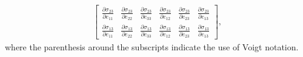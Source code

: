 \begin{eqnarray}
\begin{bmatrix}
%
\frac{\partial \sigma_{23}}{\partial e_{11}} & \frac{\partial \sigma_{23}}{\partial e_{22}} & \frac{\partial \sigma_{23}}{\partial e_{33}} & \frac{\partial \sigma_{23}}{\partial e_{12}} & \frac{\partial \sigma_{23}}{\partial e_{23}} & \frac{\partial \sigma_{23}}{\partial e_{13}} \\
%
\frac{\partial \sigma_{13}}{\partial e_{11}} & \frac{\partial \sigma_{13}}{\partial e_{22}} & \frac{\partial \sigma_{13}}{\partial e_{33}} & \frac{\partial \sigma_{13}}{\partial e_{12}} & \frac{\partial \sigma_{13}}{\partial e_{23}} & \frac{\partial \sigma_{13}}{\partial e_{13}} 
\end{bmatrix},
\label{eq:sigma_terms_Voigt}
\end{eqnarray}
%
where the parenthesis around the subscripts indicate the use of Voigt notation.








